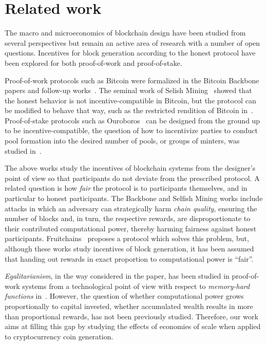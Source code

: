 \section{Related work}\label{sec:related}
The macro and microeconomics of blockchain design have been studied from
several perspectives but remain an active area of research with a number of open questions.
Incentives for block generation
according to the honest protocol have been explored for both proof-of-work and
proof-of-stake.

Proof-of-work protocols such as Bitcoin were formalized in the Bitcoin
Backbone~\cite{EC:GarKiaLeo15,C:GarKiaLeo17} papers and follow-up
works~\cite{pass2017analysis}. The seminal work of Selish
Mining~\cite{FC:EyaSir14,FC:SapSomZoh16} showed that the honest behavior is not
incentive-compatible in Bitcoin, but the protocol can be modified to behave
that way, such as the restricted rendition of Bitcoin
in~\cite{kiayias2016blockchain}.  Proof-of-stake protocols such as
Ouroboros~\cite{C:KRDO17} can be designed from the ground up to be
incentive-compatible, \eg the question of how to incentivize parties to conduct
pool formation into the desired number of pools, or groups of minters, was
studied in~\cite{bkks2018}.

The above works study the incentives of blockchain systems from the designer's
point of view so that participants do not deviate from the prescribed protocol.
A related question is how \emph{fair} the protocol is to participants
themselves, and in particular to honest participants. The Backbone and Selfish
Mining works include attacks in which an adversary can strategically harm
\emph{chain quality}, ensuring the number of blocks and, in turn, the respective
rewards, are disproportionate to their contributed computational power, thereby
harming fairness against honest participants. Fruitchains~\cite{PODC:PasShi17}
proposes a protocol which solves this problem, but, although
these works study incentives of block generation, it has been
assumed that handing out rewards in exact proportion to computational power is
``fair''.

\emph{Egalitarianism}, in the way considered in the paper, has been studied in
proof-of-work systems from a technological point of view with respect to
\emph{memory-hard functions} in~\cite{pebbling}.  However, the question
of whether computational power grows proportionally to capital invested, \ie
whether accumulated wealth results in more than proportional rewards, has not
been previously studied. Therefore, our work aims at filling this gap by
studying the effects of economies of scale when applied to cryptocurrency coin
generation.

